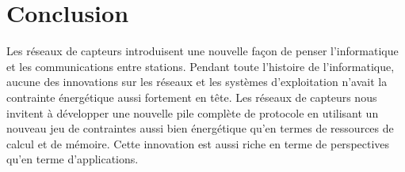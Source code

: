 \section*{Conclusion}

Les réseaux de capteurs introduisent une nouvelle façon de penser
l'informatique et les communications entre stations. Pendant toute l'histoire
de l'informatique, aucune des innovations sur les réseaux et les systèmes
d'exploitation n'avait la contrainte énergétique aussi fortement en tête. Les
réseaux de capteurs nous invitent à développer une nouvelle pile complète de
protocole en utilisant un nouveau jeu de contraintes aussi bien énergétique
qu'en termes de ressources de calcul et de mémoire.  Cette innovation est aussi
riche en terme de perspectives qu'en terme d'applications.
